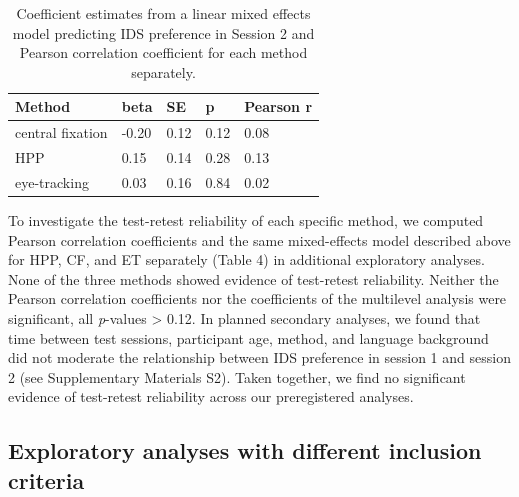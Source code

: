 \documentclass[
  english,
  man,floatsintext]{apa6}
\begin{document}
\begin{table}[tbp]

\begin{center}
\begin{threeparttable}

\caption{\label{tab:unnamed-chunk-6}Coefficient estimates from a linear mixed effects model predicting IDS preference in Session 2 and Pearson correlation coefficient for each method separately.}

\begin{tabular}{lllll}
\toprule
Method & beta & SE & p & Pearson r\\
\midrule
central fixation & -0.20 & 0.12 & 0.12 & 0.08\\
HPP & 0.15 & 0.14 & 0.28 & 0.13\\
eye-tracking & 0.03 & 0.16 & 0.84 & 0.02\\
\bottomrule
\end{tabular}

\end{threeparttable}
\end{center}

\end{table}

To investigate the test-retest reliability of each specific method, we computed Pearson correlation coefficients and the same mixed-effects model described above for HPP, CF, and ET separately (Table 4) in additional exploratory analyses.
None of the three methods showed evidence of test-retest reliability.
Neither the Pearson correlation coefficients nor the coefficients of the multilevel analysis were significant, all \emph{p}-values \textgreater{} 0.12.
In planned secondary analyses, we found that time between test sessions, participant age, method, and language background did not moderate the relationship between IDS preference in session 1 and session 2 (see Supplementary Materials S2).
Taken together, we find no significant evidence of test-retest reliability across our preregistered analyses.

\hypertarget{exploratory-analyses-with-different-inclusion-criteria}{%
\subsection{Exploratory analyses with different inclusion criteria}\label{exploratory-analyses-with-different-inclusion-criteria}}
\end{document}
